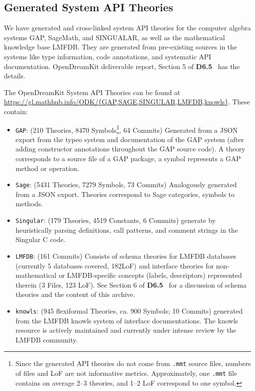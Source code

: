 \subsection{Generated System API Theories}\label{sec:sysapis:gentheories}

We have generated and cross-linked system API theories for the computer algebra systems
GAP, SageMath, and SINGUALAR, as well as the mathematical knowledge base LMFDB. They are
generated from pre-existing sources in the systems like type information, code
annotations, and systematic API documentation.  OpenDreamKit deliverable report, Section
5 of \textbf{D6.5}~\cite{ODK-D6.5} has the details.  


The OpenDreamKit System API Theories can be found at
\url{https://gl.mathhub.info/ODK/{GAP,SAGE,SINGULAR,LMFDB,knowls}}. These contain:
\begin{itemize}
\item \texttt{GAP}: (210 Theories, 8470 Symbols\footnote{Since the generated API theories
    do not come from \texttt{.mmt} source files, numbers of files and LoF are not
    informative metrics. Approximately, one \texttt{.mmt} file contains on average 2--3
    theories, and 1--2 LoF correspond to one symbol.}, 64 Commits) Generated from a JSON
  export from the typeo system and documentation of the GAP system (after adding
  constructor annotations throughout the GAP source code). A theory corresponds to a
  source file of a GAP package, a symbol represents a GAP method or operation.
\item \texttt{Sage}: (5431 Theories, 7279 Symbols, 73 Commits) Analogously generated from
  a JSON export. Theories correspond to Sage categories, symbols to methods.
\item \texttt{Singular}: (179 Theories, 4519 Constants, 6 Commits) generate by
  heuristically parsing definitions, call patterns, and comment strings in the Singular C
  code. 
\item \texttt{LMFDB}: (161 Commits) Consists of schema theories for LMFDB databases
  (currently 5 databases covered, 182LoF) and interface theories for non-mathematical or
  LMFDB-specific concepts (labels, descriptors) represented therein (3 Files, 123
  LoF). See Section 6 of \textbf{D6.5}~\cite{ODK-D6.5} for a discussion of schema theories
  and the content of this archive. 
\item \texttt{knowls}: (945 flexiformal Theories, ca. 900 Symbols; 10 Commits) generated
  from the LMFDB knowls system of interface documentations. The knowls resource is
  actively maintained and currently under intense review by the LMFDB community. 
\end{itemize}

